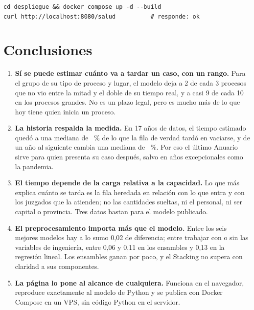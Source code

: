 \documentclass[11pt,a4paper]{article}
\begin{document}
\begin{verbatim}
cd despliegue && docker compose up -d --build
curl http://localhost:8080/salud          # responde: ok
\end{verbatim}

\section*{Conclusiones}

\begin{enumerate}
  \item \textbf{Sí se puede estimar cuánto va a tardar un caso, con un rango.} Para el grupo de su tipo de proceso y
  lugar, el modelo deja a 2 de cada 3 procesos que no vio entre la mitad y el doble de su tiempo real, y a casi 9 de cada
  10 en los procesos grandes. No es un plazo legal, pero es mucho más de lo que hoy tiene quien inicia un proceso.
  \item \textbf{La historia respalda la medida.} En 17 años de datos, el tiempo estimado quedó a una mediana de
  \histErrVaciado~\% de lo que la fila de verdad tardó en vaciarse, y de un año al siguiente cambia una mediana de
  \histErrAnterior~\%. Por eso el último Anuario sirve para quien presenta su caso después, salvo en años excepcionales
  como la pandemia.
  \item \textbf{El tiempo depende de la carga relativa a la capacidad.} Lo que más explica cuánto se tarda es la fila
  heredada en relación con lo que entra y con los juzgados que la atienden; no las cantidades sueltas, ni el personal,
  ni ser capital o provincia. Tres datos bastan para el modelo publicado.
  \item \textbf{El preprocesamiento importa más que el modelo.} Entre los seis mejores modelos hay a lo sumo 0,02 de
  diferencia; entre trabajar con o sin las variables de ingeniería, entre 0,06 y 0,11 en los ensambles y 0,13 en la regresión
  lineal. Los ensambles ganan por poco, y el Stacking no supera con claridad a sus componentes.
  \item \textbf{La página lo pone al alcance de cualquiera.} Funciona en el navegador, reproduce exactamente al modelo de
  Python y se publica con Docker Compose en un VPS, sin código Python en el servidor.
\end{enumerate}
\end{document}
